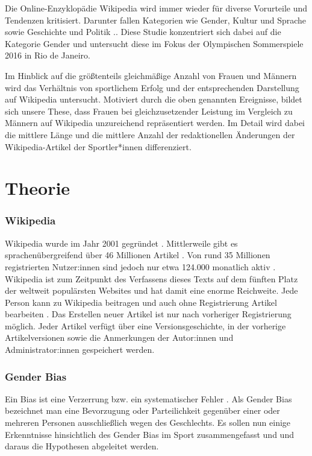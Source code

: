 \documentclass[11pt]{article}
\begin{document}
Die Online-Enzyklopädie Wikipedia wird immer wieder für diverse Vorurteile und Tendenzen kritisiert. Darunter fallen Kategorien wie Gender, Kultur und Sprache sowie Geschichte und Politik \parencite{PoppyNoor}.. Diese Studie konzentriert sich dabei auf die Kategorie Gender und untersucht diese im Fokus der Olympischen Sommerspiele 2016 in Rio de Janeiro.

Im Hinblick auf die größtenteils gleichmäßige Anzahl von Frauen und Männern wird das Verhältnis von sportlichem Erfolg und der entsprechenden Darstellung auf Wikipedia untersucht. Motiviert durch die oben genannten Ereignisse, bildet sich unsere These, dass Frauen bei gleichzusetzender Leistung im Vergleich zu Männern auf Wikipedia unzureichend repräsentiert werden. Im Detail wird dabei die mittlere Länge und die mittlere Anzahl der redaktionellen Änderungen der Wikipedia-Artikel der Sportler*innen differenziert.

\section*{Theorie}
\label{intro}
\subsubsection*{Wikipedia}
Wikipedia wurde im Jahr 2001 gegründet \parencite{wikipediaTimeline}. Mittlerweile gibt es sprachenübergreifend über 46 Millionen Artikel \parencite{wikipedia_Size}. Von rund 35 Millionen registrierten Nutzer:innen sind jedoch nur etwa 124.000 monatlich aktiv \parencite{wikipedians}. 
Wikipedia ist zum Zeitpunkt des Verfassens dieses Texts auf dem fünften Platz der weltweit populärsten Websites \parencite{Alexa2019} und hat damit eine enorme Reichweite.
Jede Person kann zu Wikipedia beitragen und auch ohne Registrierung Artikel bearbeiten \parencite{wikipediaTutorial}. Das Erstellen neuer Artikel ist nur nach vorheriger Registrierung möglich. Jeder Artikel verfügt über eine Versionsgeschichte, in der vorherige Artikelversionen sowie die Anmerkungen der Autor:innen und Administrator:innen gespeichert werden.

\subsubsection*{Gender Bias}

Ein Bias ist eine Verzerrung bzw. ein systematischer Fehler \parencite{Wirtz}. Als Gender Bias bezeichnet man eine Bevorzugung oder Parteilichkeit gegenüber einer oder mehreren Personen ausschließlich wegen des Geschlechts. Es sollen nun einige Erkenntnisse hinsichtlich des Gender Bias im Sport zusammengefasst und und daraus die Hypothesen abgeleitet werden.
\end{document}
